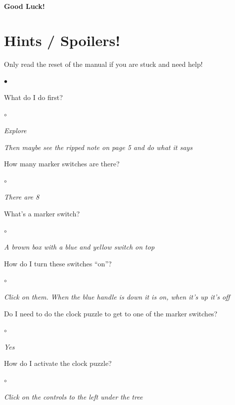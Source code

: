 \documentclass{book}
\newenvironment{list1}%
{\begin{list}{$\bullet$}{\setlength{\parsep}{0.05ex}\setlength{\itemsep}{0mm}}}
{\end{list}\normalsize}
\newenvironment{list2}%
{\begin{list}{$\circ$}{\setlength{\parsep}{0.05ex}\setlength{\itemsep}{0mm}}}
{\end{list}\normalsize}
\begin{document}
\begin{center}
{\bf Good Luck!}
\end{center}

\pagebreak

\section*{Hints / Spoilers!}

\noindent
Only read the reset of the manual if you are stuck and need help!
\vfill

\pagebreak

\begin{list1}
	\item What do I do first?
	\begin{list2}
		\item {\em Explore}
		\item {\em  Then maybe see the ripped note on page 5
			and do what it says}
	\end{list2}
	\item How many marker switches are there?
	\begin{list2}
		\item {\em There are 8}
	\end{list2}

	\item What's a marker switch?
	\begin{list2}
		\item {\em A brown box with a blue and yellow switch on top}
	\end{list2}
\pagebreak
	\item How do I turn these switches ``on''?
	\begin{list2}
		\item {\em Click on them.  When the blue handle is down
			it is on, when it's up it's off}
	\end{list2}

	\item Do I need to do the clock puzzle to get to one of the marker
		switches?
	\begin{list2}
		\item {\em Yes}
	\end{list2}

	\item How do I activate the clock puzzle?
	\begin{list2}
		\item {\em Click on the controls to the left under the tree}
	\end{list2}


\end{list1}
\end{document}
